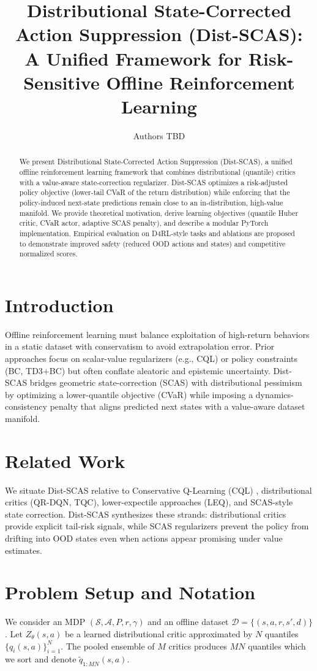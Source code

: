 \documentclass{article}
\title{Distributional State-Corrected Action Suppression (Dist-SCAS):\\A Unified Framework for Risk-Sensitive Offline Reinforcement Learning}
\author{Authors TBD}
\date{}
\begin{document}
\maketitle

\begin{abstract}
We present Distributional State-Corrected Action Suppression (Dist-SCAS), a unified offline reinforcement learning framework that combines distributional (quantile) critics with a value-aware state-correction regularizer. Dist-SCAS optimizes a risk-adjusted policy objective (lower-tail CVaR of the return distribution) while enforcing that the policy-induced next-state predictions remain close to an in-distribution, high-value manifold. We provide theoretical motivation, derive learning objectives (quantile Huber critic, CVaR actor, adaptive SCAS penalty), and describe a modular PyTorch implementation. Empirical evaluation on D4RL-style tasks and ablations are proposed to demonstrate improved safety (reduced OOD actions and states) and competitive normalized scores.
\end{abstract}

\section{Introduction}
Offline reinforcement learning must balance exploitation of high-return behaviors in a static dataset with conservatism to avoid extrapolation error. Prior approaches focus on scalar-value regularizers (e.g., CQL) or policy constraints (BC, TD3+BC) but often conflate aleatoric and epistemic uncertainty. Dist-SCAS bridges geometric state-correction (SCAS) with distributional pessimism by optimizing a lower-quantile objective (CVaR) while imposing a dynamics-consistency penalty that aligns predicted next states with a value-aware dataset manifold.

\section{Related Work}
We situate Dist-SCAS relative to Conservative Q-Learning (CQL) \cite{cql2020}, distributional critics (QR-DQN, TQC), lower-expectile approaches (LEQ), and SCAS-style state correction. Dist-SCAS synthesizes these strands: distributional critics provide explicit tail-risk signals, while SCAS regularizers prevent the policy from drifting into OOD states even when actions appear promising under value estimates.

\section{Problem Setup and Notation}
We consider an MDP $(\mathcal{S},\mathcal{A},P,r,\gamma)$ and an offline dataset $\mathcal{D}=\{(s,a,r,s',d)\}$. Let $Z_\theta(s,a)$ be a learned distributional critic approximated by $N$ quantiles $\{q_i(s,a)\}_{i=1}^N$. The pooled ensemble of $M$ critics produces $MN$ quantiles which we sort and denote $\tilde q_{1:MN}(s,a)$.
\end{document}
